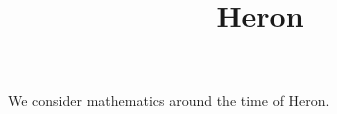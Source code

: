\documentclass{ximera}
\title{Heron}
\begin{document}
\begin{abstract}
\end{abstract}
\maketitle

We consider mathematics around the time of Heron.
\end{document}
